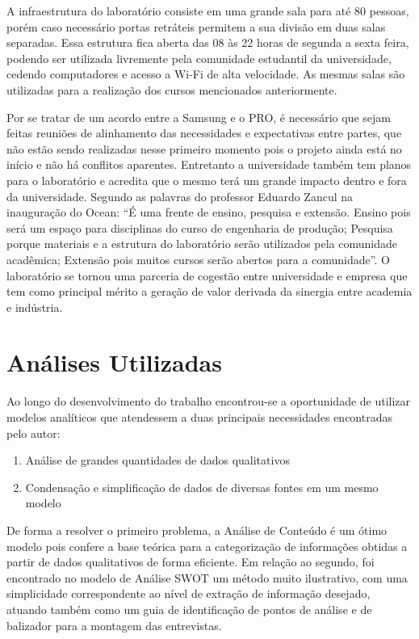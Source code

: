 A infraestrutura do laboratório consiste em uma grande sala para até 80 pessoas, porém caso necessário portas retráteis permitem a sua divisão em duas salas separadas. Essa estrutura fica aberta das 08 às 22 horas de segunda a sexta feira, podendo ser utilizada livremente pela comunidade estudantil da universidade, cedendo computadores e acesso a Wi-Fi de alta velocidade. As mesmas salas são utilizadas para a realização dos cursos mencionados anteriormente.

Por se tratar de um acordo entre a Samsung e o PRO, é necessário que sejam feitas reuniões de alinhamento das necessidades e expectativas entre partes, que não estão sendo realizadas nesse primeiro momento pois o projeto ainda está no início e não há conflitos aparentes. Entretanto a universidade também tem planos para o laboratório e acredita que o mesmo terá um grande impacto dentro e fora da universidade. Segundo as palavras do professor Eduardo Zancul na inauguração do Ocean: “É uma frente de ensino, pesquisa e extensão. Ensino pois será um espaço para disciplinas do curso de engenharia de produção; Pesquisa porque materiais e a estrutura do laboratório serão utilizados pela comunidade acadêmica; Extensão pois muitos cursos serão abertos para a comunidade”. O laboratório se tornou uma parceria de cogestão entre universidade e empresa que tem como principal mérito a geração de valor derivada da sinergia entre academia e indústria. 

\section{Análises Utilizadas}

Ao longo do desenvolvimento do trabalho encontrou-se a oportunidade de utilizar modelos analíticos que atendessem a duas principais necessidades encontradas pelo autor: 

\begin{enumerate}
\item Análise de grandes quantidades de dados qualitativos
\item Condensação e simplificação de dados de diversas fontes em um mesmo modelo
\end{enumerate} 

De forma a resolver o primeiro problema, a Análise de Conteúdo é um ótimo modelo pois confere a base teórica para a categorização de informações obtidas a partir de dados qualitativos de forma eficiente. Em relação ao segundo, foi encontrado no modelo de Análise SWOT um método muito ilustrativo, com uma simplicidade correspondente ao nível de extração de informação desejado, atuando também como um guia de identificação de pontos de análise e de balizador para a montagem das entrevistas.


